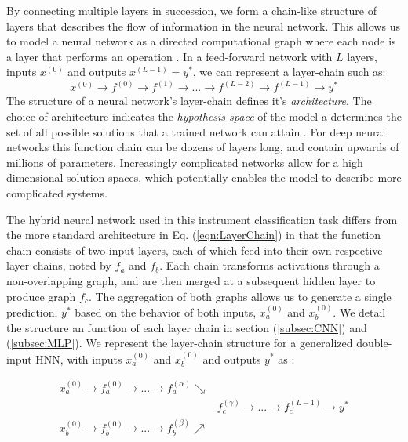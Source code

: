 \documentclass[conference,onecolumn,letterpaper]{IEEEtran}
\begin{document}
By connecting multiple layers in succession, we form a chain-like structure of layers that describes the flow of information in the neural network. This allows us to model a neural network as a directed computational graph where each node is a layer that performs an operation  \cite{Geron,Goodfellow}. In a feed-forward network with $L$ layers, inputs $x^{(0)}$ and outputs $x^{(L-1)} = y^*$, we can represent a layer-chain such as:
\begin{equation}
    \label{eqn:LayerChain}
    x^{(0)} \rightarrow f^{(0)} \rightarrow f^{(1)} \rightarrow ... \rightarrow f^{(L-2)} \rightarrow f^{(L-1)} \rightarrow y^*
\end{equation}
The structure of a neural network's layer-chain defines it's \textit{architecture}. The choice of architecture indicates the \textit{hypothesis-space} of the model a determines the set of all possible solutions that a trained network can attain \cite{Goodfellow,James}. For deep neural networks this function chain can be dozens of layers long, and contain upwards of millions of parameters. Increasingly complicated networks allow for a high dimensional solution spaces, which potentially enables the model to describe more complicated systems.

The hybrid neural network used in this instrument classification task differs from the more standard architecture in Eq. (\ref{eqn:LayerChain}) in that the function chain consists of two input layers, each of which feed into their own respective layer chains, noted by $f_a$ and $f_b$. Each chain transforms activations through a non-overlapping graph, and are then merged at a subsequent hidden layer to produce graph $f_c$. The aggregation of both graphs allows us to generate a single prediction, $y^*$ based on the behavior of both inputs, $x^{(0)}_a$ and $x^{(0)}_b$. We detail the structure an function of each layer chain in section (\ref{subsec:CNN}) and (\ref{subsec:MLP}). We represent the layer-chain structure for a generalized double-input HNN, with inputs $x^{(0)}_a$ and $x^{(0)}_b$ and outputs $y^*$ as :

\begin{equation}
    \label{eqn:LayerGraph}
    \begin{split}
        x^{(0)}_a \rightarrow f^{(0)}_a \rightarrow  ... \rightarrow f^{(\alpha)}_a \searrow &\\
                & f^{(\gamma)}_c \rightarrow ... \rightarrow f^{(L-1)}_c \rightarrow y^* \\
        x^{(0)}_b \rightarrow f^{(0)}_b \rightarrow  ... \rightarrow f^{(\beta)}_b \nearrow &\\
    \end{split}
\end{equation}
\end{document}
